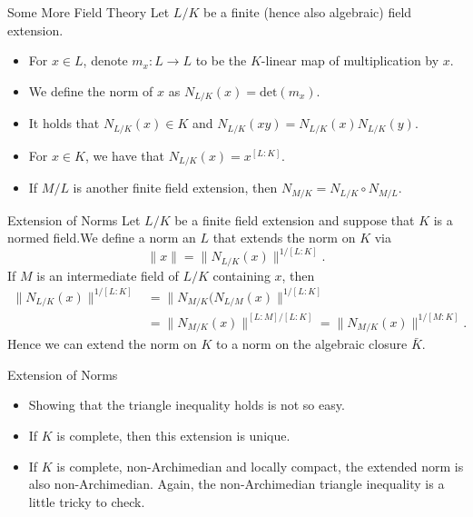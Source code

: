 \documentclass{beamer}
\begin{document}
\begin{frame}{Some More Field Theory}
    Let $L/K$ be a finite (hence also algebraic) field extension. 
    \begin{itemize}
        \item For $x \in L$, denote $m_x \colon L \to L$ to be the $K$-linear map of 
        multiplication by $x$.
        \pause 
        \item We define the norm of $x$ as $N_{L/K}(x) = \mathrm{det}(m_x)$.
        \pause 
        \item It holds that $N_{L/K}(x) \in K$ and $N_{L/K}(xy) = N_{L/K}(x)N_{L/K}(y)$.
        \pause 
        \item For $x \in K$, we have that $N_{L/K}(x) = x^{[L : K]}$.
        \pause 
        \item If $M/L$ is another finite field extension, then $N_{M/K} = N_{L/K} \circ N_{M/L}$.
    \end{itemize}
\end{frame}

\begin{frame}{Extension of Norms}
    Let $L/K$ be a finite field extension and suppose that $K$ is a normed field.\pause We define a norm an $L$ that extends the norm on $K$ via 
    \begin{equation*}
        \|x\| = \|N_{L/K}(x)\|^{1/[L : K]}.
    \end{equation*}
    \pause 
    If $M$ is an intermediate field of $L/K$ containing $x$, then 
    \begin{align*}
        \|N_{L/K}(x)\|^{1/[L : K]} &= \|N_{M/K}(N_{L/M}(x)\|^{1/[L : K]} \\ &= \|N_{M/K}(x)\|^{[L : M]/[L : K]} = \|N_{M/K}(x)\|^{1/[M : K]}.
    \end{align*}
    \pause 
    Hence we can extend the norm on $K$ to a norm on the algebraic closure $\bar{K}$.
\end{frame}

\begin{frame}{Extension of Norms}
    \begin{itemize}
        \item Showing that the triangle inequality holds is not so easy.
        \pause 
        \item If $K$ is complete, then this extension is unique. 
        \pause 
        \item If $K$ is complete, non-Archimedian and locally compact, the extended norm is also non-Archimedian. Again, the non-Archimedian triangle inequality is a little tricky to check.
    \end{itemize}
\end{frame}
\end{document}
